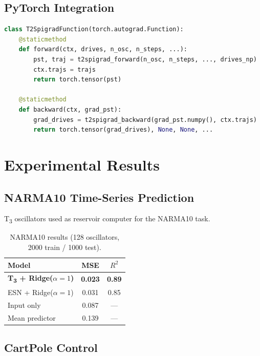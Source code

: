 \documentclass[twocolumn,10pt]{article}
\newcommand{\Tthree}{T\textsubscript{3}}
\begin{document}
\subsection{PyTorch Integration}

\begin{lstlisting}[language=Python]
class T2SpigradFunction(torch.autograd.Function):
    @staticmethod
    def forward(ctx, drives, n_osc, n_steps, ...):
        pst, traj = t2spigrad_forward(n_osc, n_steps, ..., drives_np)
        ctx.trajs = trajs
        return torch.tensor(pst)

    @staticmethod
    def backward(ctx, grad_pst):
        grad_drives = t2spigrad_backward(grad_pst.numpy(), ctx.trajs)
        return torch.tensor(grad_drives), None, None, ...
\end{lstlisting}

\section{Experimental Results}

\subsection{NARMA10 Time-Series Prediction}

\Tthree{} oscillators used as reservoir computer for the NARMA10 task.

\begin{table}[h]
\centering
\caption{NARMA10 results (128 oscillators, 2000 train / 1000 test).}
\begin{tabular}{lcc}
\toprule
Model & MSE & $R^2$ \\
\midrule
\textbf{\Tthree{} + Ridge($\alpha=1$)} & \textbf{0.023} & \textbf{0.89} \\
ESN + Ridge($\alpha=1$) & 0.031 & 0.85 \\
Input only & 0.087 & --- \\
Mean predictor & 0.139 & --- \\
\bottomrule
\end{tabular}
\end{table}

\subsection{CartPole Control}
\end{document}
